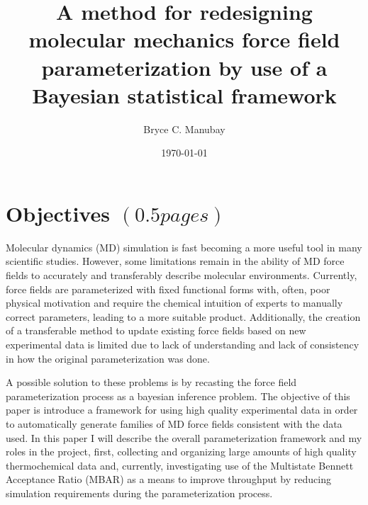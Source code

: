 \documentclass[rmp,nofootinbib,superscriptaddress,12pt,tightenlines,notitlepage]{revtex4-1}
\begin{document}


\title{A method for redesigning molecular mechanics force field parameterization by use of a Bayesian statistical framework}
\author{Bryce C. Manubay} 
\date{\today}

\maketitle
\section{Objectives $\left(0.5 pages\right)$}
Molecular dynamics (MD) simulation is fast becoming a more useful tool in many scientific studies. However, some limitations remain in the ability of MD force fields to accurately and transferably describe molecular environments. Currently, force fields are parameterized with fixed functional forms with, often, poor physical motivation and require the chemical intuition of experts to manually correct parameters, leading to a more suitable product. Additionally, the creation of a transferable method to update existing force fields based on new experimental data is limited due to lack of understanding and lack of consistency in how the original parameterization was done.

A possible solution to these problems is by recasting the force field parameterization process as a bayesian inference problem. The objective of this paper is introduce a framework for using high quality experimental data in order to automatically generate families of MD force fields consistent with the data used. In this paper I will describe the overall parameterization framework and my roles in the project, first, collecting and organizing large amounts of high quality thermochemical data and, currently, investigating use of the Multistate Bennett Acceptance Ratio (MBAR) as a means to improve throughput by reducing simulation requirements during the parameterization process.
\end{document}
